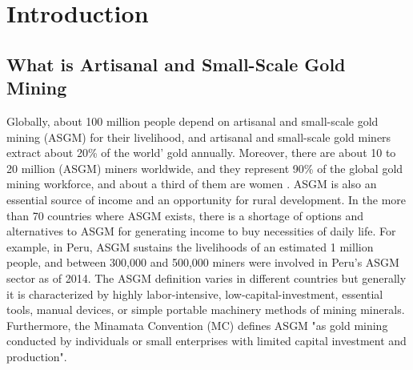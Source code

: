 
\chapter{Introduction}
\section{What is Artisanal and Small-Scale Gold Mining}
Globally, about 100 million people depend on artisanal and small-scale gold mining (ASGM) for their livelihood, and artisanal and small-scale gold miners extract about 20\% of the world’ gold annually. Moreover, there are about 10 to 20 million (ASGM) miners worldwide, and they represent 90\% of the global gold mining workforce, and about a third of them are women \cite{planetgold_planetgold_2021}. ASGM is also an essential source of income and an opportunity for rural development. In the more than 70 countries where ASGM exists, there is a shortage of options and alternatives to ASGM for generating income to buy necessities of daily life. For example, in Peru, ASGM sustains the livelihoods of an estimated 1 million people, and between 300,000 and 500,000 miners were involved in Peru’s ASGM sector as of 2014. The ASGM definition varies in different countries but generally it is characterized by highly labor-intensive, low-capital-investment, essential tools, manual devices, or simple portable machinery methods of mining minerals. Furthermore, the Minamata Convention (MC) defines ASGM "as gold mining conducted by individuals or small enterprises with limited capital investment and production"\cite{unep_minamata_2019}.

